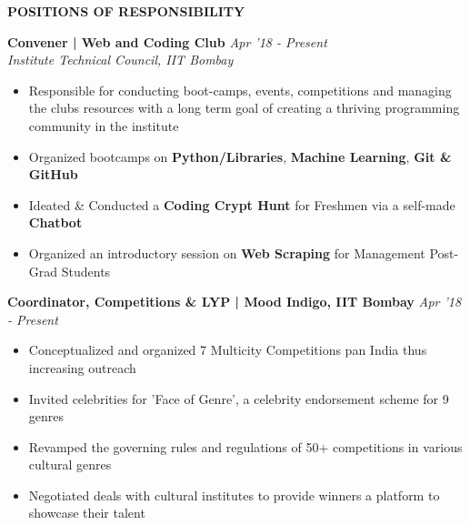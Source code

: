 \documentclass[11pt]{article}%
\begin{document}
\begin{flushleft}
\bf{\LARGE{P}\Large{OSITIONS} \LARGE{O}\Large{F} \LARGE{R}\Large{ESPONSIBILITY}}
\vspace{-3mm}
\end{flushleft}
\vspace{-4mm}
\hrulefill
\vspace{-0.2cm}
{\flushleft \bf \large{Convener | Web and Coding Club}} \hfill {{{\em {Apr '18 - Present}}}}\\{\em{Institute Technical Council, IIT Bombay}}
\begin{itemize}
\setlength\itemsep{0.01em}
\vspace{-0.3cm}
\item Responsible for conducting boot-camps, events, competitions and managing the club\textsc{}s resources with a 
long term goal of creating a thriving programming community in the institute
\vspace{-1.2mm}
\item Organized bootcamps on {\bf Python/Libraries}, {\bf Machine Learning}, {\bf Git \& GitHub}
\vspace{-1.2mm}
\item Ideated \& Conducted a {\bf Coding Crypt Hunt} for Freshmen via a self-made {\bf Chatbot}
\vspace{-1.2mm}
\item Organized an introductory session on {\bf Web Scraping} for Management Post-Grad Students
\end{itemize}
\vspace{-1mm}
\vspace{-5mm}
{\flushleft \bf \large{Coordinator, Competitions \& LYP | Mood Indigo, IIT Bombay}} \hfill {{{\em {Apr '18 - Present}}}}
\begin{itemize}
\setlength\itemsep{0.01em}
\vspace{-0.2cm}
\item Conceptualized and organized 7 Multicity Competitions pan India thus increasing outreach
\vspace{-1.2mm}
\item Invited celebrities for 'Face of Genre', a celebrity endorsement scheme for 9 genres
\vspace{-1.2mm}
\item Revamped the governing rules and regulations of 50+ competitions in various cultural genres
\vspace{-1.2mm}
\item Negotiated deals with cultural institutes to provide winners a platform to showcase their talent
\end{itemize}
\end{document}
